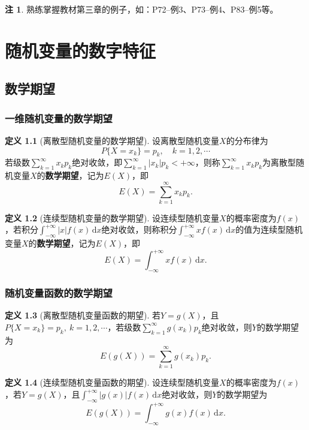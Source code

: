 \documentclass[11pt,a4paper]{report}
\theoremstyle{definition}
\newtheorem{definition}{定义}[chapter]
\newtheorem{remark}{注}[chapter]
\theoremstyle{plain}
\begin{document}
\begin{remark}
熟练掌握教材第三章的例子，如：P72--例3、P73--例4、P83--例5等。
\end{remark}

\chapter{随机变量的数字特征}

\section{数学期望}

\subsection{一维随机变量的数学期望}

\begin{definition}[离散型随机变量的数学期望]
设离散型随机变量$X$的分布律为
\[
P\{X=x_k\}=p_k,\quad k=1,2,\cdots
\]
若级数$\sum_{k=1}^{\infty}x_k p_k$绝对收敛，即$\sum_{k=1}^{\infty}|x_k|p_k<+\infty$，则称$\sum_{k=1}^{\infty}x_k p_k$为离散型随机变量$X$的\textbf{数学期望}，记为$E(X)$，即
\[
E(X)=\sum_{k=1}^{\infty}x_k p_k.
\]
\end{definition}

\begin{definition}[连续型随机变量的数学期望]
设连续型随机变量$X$的概率密度为$f(x)$，若积分$\int_{-\infty}^{+\infty}|x|f(x)\,\mathrm{d}x$绝对收敛，则称积分$\int_{-\infty}^{+\infty}x f(x)\,\mathrm{d}x$的值为连续型随机变量$X$的\textbf{数学期望}，记为$E(X)$，即
\[
E(X)=\int_{-\infty}^{+\infty}x f(x)\,\mathrm{d}x.
\]
\end{definition}

\subsection{随机变量函数的数学期望}

\begin{definition}[离散型随机变量函数的期望]
若$Y=g(X)$，且$P\{X=x_k\}=p_k,\ k=1,2,\cdots$，若级数$\sum_{k=1}^{\infty}g(x_k)p_k$绝对收敛，则$Y$的数学期望为
\[
E(g(X))=\sum_{k=1}^{\infty}g(x_k)p_k.
\]
\end{definition}

\begin{definition}[连续型随机变量函数的期望]
设连续型随机变量$X$的概率密度为$f(x)$，若$Y=g(X)$，且$\int_{-\infty}^{+\infty}|g(x)|f(x)\,\mathrm{d}x$绝对收敛，则$Y$的数学期望为
\[
E(g(X))=\int_{-\infty}^{+\infty}g(x)f(x)\,\mathrm{d}x.
\]
\end{definition}
\end{document}
